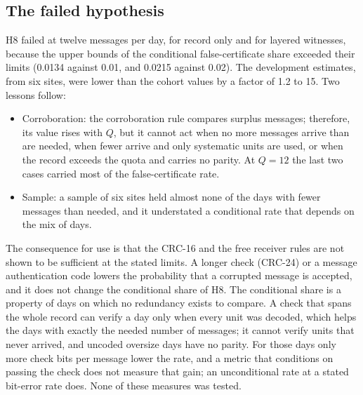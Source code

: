 \subsection{The failed hypothesis}
H8 failed at twelve messages per day, for record only and for layered witnesses, because the upper bounds of the conditional false-certificate share exceeded their limits (0.0134 against 0.01, and 0.0215 against 0.02). The development estimates, from six sites, were lower than the cohort values by a factor of 1.2 to 15. Two lessons follow:
\begin{itemize}
  \item Corroboration: the corroboration rule compares surplus messages; therefore, its value rises with $Q$, but it cannot act when no more messages arrive than are needed, when fewer arrive and only systematic units are used, or when the record exceeds the quota and carries no parity. At $Q = 12$ the last two cases carried most of the false-certificate rate.
  \item Sample: a sample of six sites held almost none of the days with fewer messages than needed, and it understated a conditional rate that depends on the mix of days.
\end{itemize}
The consequence for use is that the CRC-16 and the free receiver rules are not shown to be sufficient at the stated limits. A longer check (CRC-24) or a message authentication code lowers the probability that a corrupted message is accepted, and it does not change the conditional share of H8. The conditional share is a property of days on which no redundancy exists to compare. A check that spans the whole record can verify a day only when every unit was decoded, which helps the days with exactly the needed number of messages; it cannot verify units that never arrived, and uncoded oversize days have no parity. For those days only more check bits per message lower the rate, and a metric that conditions on passing the check does not measure that gain; an unconditional rate at a stated bit-error rate does. None of these measures was tested.

